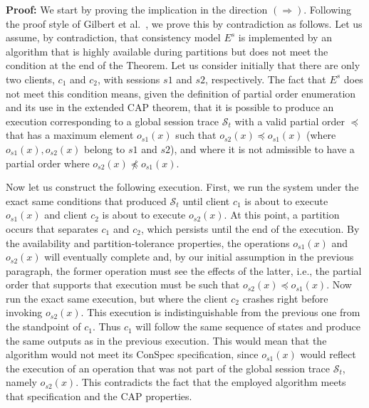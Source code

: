 \documentclass[journal,compsoc]{IEEEtran}
\begin{document}

\par \textbf{Proof:} We start by proving the implication in the direction $(\Rightarrow)$. Following the proof style of Gilbert et al.~\cite{Gilbert:2002:BCF:564585.564601}, we prove this by contradiction as follows.  Let us assume, by contradiction, that consistency model $E^s$ is implemented by an algorithm that is highly available during partitions but does not meet the condition at the end of the Theorem. Let us consider initially that there are only two clients, $c_1$ and $c_2$, with sessions $s1$ and $s2$, respectively. The fact that $E^s$  does not meet this condition means, given the definition of partial order enumeration and its use in the extended CAP theorem, that it is possible to produce an execution corresponding to a global session trace $\mathcal{S}_t$ with a valid partial order $\preccurlyeq$ that has a maximum element $o_{s1}(x)$ such that $o_{s2}(x)\preccurlyeq o_{s1}(x)$ (where $o_{s1}(x),o_{s2}(x)$ belong to $s1$ and $s2$), and where it is not admissible to have a partial order where $o_{s2}(x)\not\preccurlyeq o_{s1}(x)$.

Now let us construct the following execution. First, we run the system under the exact same conditions that produced $\mathcal{S}_t$ until client $c_1$ is about to execute $o_{s1}(x)$ and client $c_2$ is about to execute $o_{s2}(x)$. At this point, a partition occurs that separates $c_1$ and $c_2$, which persists until the end of the execution. By the availability and partition-tolerance properties, the operations $o_{s1}(x)$ and $o_{s2}(x)$ will eventually complete and, by our initial assumption in the previous paragraph, the former operation must see the effects of the latter, i.e., the partial order that supports that execution must be such that $o_{s2}(x)\preccurlyeq o_{s1}(x)$. Now run the exact same execution, but where the client $c_2$ crashes right before invoking $o_{s2}(x)$. This execution is indistinguishable from the previous one from the standpoint of $c_1$. Thus $c_1$ will follow the same sequence of states and produce the same outputs as in the previous execution. This would mean that the algorithm would not meet its ConSpec specification, since $o_{s1}(x)$ would reflect the execution of an operation that was not part of the global session trace $\mathcal{S}_t$, namely $o_{s2}(x)$. This contradicts the fact that the employed algorithm meets that specification and the CAP properties.
\end{document}
